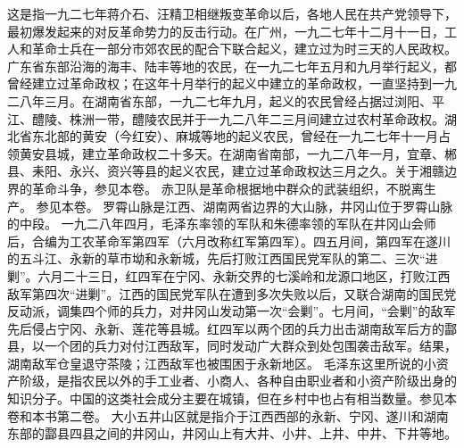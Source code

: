 \begin{maonote}
这是指一九二七年蒋介石、汪精卫相继叛变革命以后，各地人民在共产党领导下，最初爆发起来的对反革命势力的反击行动。在广州，一九二七年十二月十一日，工人和革命士兵在一部分市郊农民的配合下联合起义，建立过为时三天的人民政权。广东省东部沿海的海丰、陆丰等地的农民，在一九二七年五月和九月举行起义，都曾经建立过革命政权；在这年十月举行的起义中建立的革命政权，一直坚持到一九二八年三月。在湖南省东部，一九二七年九月，起义的农民曾经占据过浏阳、平江、醴陵、株洲一带，醴陵农民并于一九二八年二三月间建立过农村革命政权。湖北省东北部的黄安（今红安）、麻城等地的起义农民，曾经在一九二七年十一月占领黄安县城，建立革命政权二十多天。在湖南省南部，一九二八年一月，宜章、郴县、耒阳、永兴、资兴等县的起义农民，建立过革命政权达三月之久。关于湘赣边界的革命斗争，参见本卷。
赤卫队是革命根据地中群众的武装组织，不脱离生产。
参见本卷。
罗霄山脉是江西、湖南两省边界的大山脉，井冈山位于罗霄山脉的中段。
一九二八年四月，毛泽东率领的军队和朱德率领的军队在井冈山会师后，合编为工农革命军第四军（六月改称红军第四军）。四五月间，第四军在遂川的五斗江、永新的草市坳和永新城，先后打败江西国民党军队的第二、三次“进剿”。六月二十三日，红四军在宁冈、永新交界的七溪岭和龙源口地区，打败江西敌军第四次“进剿”。江西的国民党军队在遭到多次失败以后，又联合湖南的国民党反动派，调集四个师的兵力，对井冈山发动第一次“会剿”。七月间，“会剿”的敌军先后侵占宁冈、永新、莲花等县城。红四军以两个团的兵力出击湖南敌军后方的酃县，以一个团的兵力对付江西敌军，同时发动广大群众到处包围袭击敌军。结果，湖南敌军仓皇退守茶陵；江西敌军也被围困于永新地区。
毛泽东这里所说的小资产阶级，是指农民以外的手工业者、小商人、各种自由职业者和小资产阶级出身的知识分子。中国的这类社会成分主要在城镇，但在乡村中也占有相当数量。参见本卷和本书第二卷。
大小五井山区就是指介于江西西部的永新、宁冈、遂川和湖南东部的酃县四县之间的井冈山，井冈山上有大井、小井、上井、中井、下井等地。
\end{maonote}
